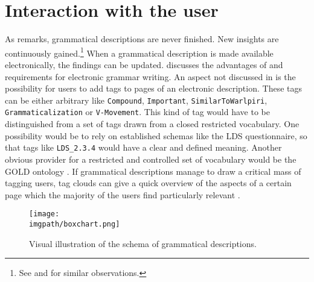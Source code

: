 \section{Interaction with the user}
As \citet{Weber2006grow} remarks, grammatical descriptions are never finished. New insights are continuously gained.\footnote{See
 \citet{Comrie1998,Cristofaro2006,Mosel2006craft,Payne2006,Rice2006} and \citet{Zaefferer2006} for similar observations.
} 
When a grammatical description is made available electronically, the findings can be updated.   \citet{Nordhoff2008jldc} discusses the  advantages of  and requirements for electronic grammar writing. An aspect not discussed in \citet{Nordhoff2008jldc} is the possibility for users to add tags to pages of an electronic description. These tags can be either arbitrary like \texttt{Compound}, \texttt{Important}, \texttt{SimilarToWarlpiri}, \texttt{Grammaticalization} or \texttt{V-Movement}. This kind of tag would have to be distinguished from a set of tags drawn from a closed restricted vocabulary. One possibility would be to rely on established schemas like the LDS questionnaire, so that tags like  \texttt{LDS\_2.3.4}  would have a clear and defined meaning. Another obvious provider for a restricted and controlled set of vocabulary would be the GOLD ontology \citep{FarrarEtAl2003}. If grammatical descriptions manage to draw a critical mass of tagging users, tag clouds can give a quick overview of the aspects of a certain page which the majority of the users find particularly relevant \citep[cf][]{BoudaEtAl2012ldl}.

\begin{figure}
 \texttt{[image: \\imgpath/boxchart.png]}
\caption{Visual illustration of the schema of grammatical descriptions.}
\label{fig:boxchart}
\end{figure}

